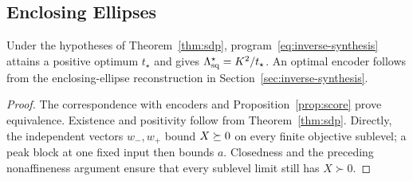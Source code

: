 \subsection{Enclosing Ellipses}
\begin{corollary}\label{cor:inverse-synthesis}
Under the hypotheses of Theorem~\ref{thm:sdp}, program~\eqref{eq:inverse-synthesis} attains a positive optimum $t_\star$ and gives $\Lambda_{\mathrm{sq}}^\star=K^2/t_\star$. An optimal encoder follows from the enclosing-ellipse reconstruction in Section~\ref{sec:inverse-synthesis}.
\end{corollary}
\begin{proof}
The correspondence with encoders and Proposition~\ref{prop:score} prove equivalence. Existence and positivity follow from Theorem~\ref{thm:sdp}. Directly, the independent vectors $w_-,w_+$ bound $X\succeq0$ on every finite objective sublevel; a peak block at one fixed input then bounds $a$. Closedness and the preceding nonaffineness argument ensure that every sublevel limit still has $X\succ0$.
\end{proof}
